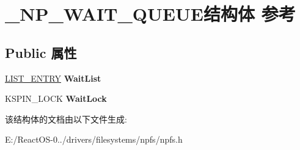 \hypertarget{struct___n_p___w_a_i_t___q_u_e_u_e}{}\section{\+\_\+\+N\+P\+\_\+\+W\+A\+I\+T\+\_\+\+Q\+U\+E\+U\+E结构体 参考}
\label{struct___n_p___w_a_i_t___q_u_e_u_e}
\subsection*{Public 属性}
\begin{DoxyCompactItemize}
\item 
\mbox{\label{struct___n_p___w_a_i_t___q_u_e_u_e_adb38c0ebf702fdba87562240fc832086}} 
\hyperlink{struct___l_i_s_t___e_n_t_r_y}{L\+I\+S\+T\+\_\+\+E\+N\+T\+RY} {\bfseries Wait\+List}
\item 
\mbox{\label{struct___n_p___w_a_i_t___q_u_e_u_e_a876086f7be25a6f16f8d2dbe373ca88f}} 
K\+S\+P\+I\+N\+\_\+\+L\+O\+CK {\bfseries Wait\+Lock}
\end{DoxyCompactItemize}


该结构体的文档由以下文件生成\+:\begin{DoxyCompactItemize}
\item 
E\+:/\+React\+O\+S-\/0../drivers/filesystems/npfs/npfs.\+h\end{DoxyCompactItemize}

